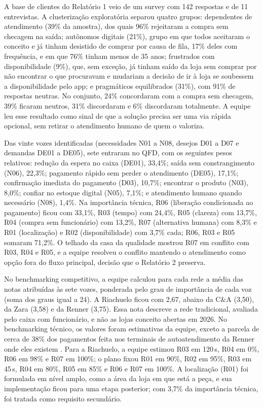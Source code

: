 A base de clientes do Relatório 1 veio de um survey com 142 respostas e de 11 entrevistas. A clusterização exploratória separou quatro grupos: dependentes de atendimento (39\% da amostra), dos quais 96\% rejeitaram a compra sem checagem na saída; autônomos digitais (21\%), grupo em que todos aceitaram o conceito e já tinham desistido de comprar por causa de fila, 17\% deles com frequência, e em que 76\% tinham menos de 35 anos; frustrados com disponibilidade (9\%), que, sem exceção, já tinham saído da loja sem comprar por não encontrar o que procuravam e mudariam a decisão de ir à loja se soubessem a disponibilidade pelo app; e pragmáticos equilibrados (31\%), com 91\% de respostas neutras. No conjunto, 24\% concordaram com a compra sem checagem, 39\% ficaram neutros, 31\% discordaram e 6\% discordaram totalmente. A equipe leu esse resultado como sinal de que a solução precisa ser uma via rápida opcional, sem retirar o atendimento humano de quem o valoriza.

Das vinte vozes identificadas (necessidades N01 a N08, desejos D01 a D07 e demandas DE01 a DE05), sete entraram no QFD, com os seguintes pesos relativos: redução da espera no caixa (DE01), 33,4\%; saída sem constrangimento (N06), 22,3\%; pagamento rápido sem perder o atendimento (DE05), 17,1\%; confirmação imediata do pagamento (D03), 10,7\%; encontrar o produto (N03), 8,0\%; confiar no estoque digital (N05), 7,1\%; e atendimento humano quando necessário (N08), 1,4\%. Na importância técnica, R06 (liberação condicionada ao pagamento) ficou com 33,1\%, R03 (tempo) com 24,4\%, R05 (clareza) com 13,7\%, R04 (compra sem funcionário) com 13,2\%, R07 (alternativa humana) com 8,3\% e R01 (localização) e R02 (disponibilidade) com 3,7\% cada; R06, R03 e R05 somaram 71,2\%. O telhado da casa da qualidade mostrou R07 em conflito com R03, R04 e R05, e a equipe resolveu o conflito mantendo o atendimento como opção fora do fluxo principal, decisão que o Relatório 2 preserva.

No benchmarking competitivo, a equipe calculou para cada rede a média das notas atribuídas às sete vozes, ponderada pelo grau de importância de cada voz (soma dos graus igual a 24). A Riachuelo ficou com 2,67, abaixo da C\&A (3,50), da Zara (3,58) e da Renner (3,75). Essa nota descreve a rede tradicional, avaliada pelo caixa com funcionário, e não as lojas conceito abertas em 2026. No benchmarking técnico, os valores foram estimativas da equipe, exceto a parcela de cerca de 38\% dos pagamentos feita nos terminais de autoatendimento da Renner onde eles existem \cite{consumidormoderno2025renner}. Para a Riachuelo, a equipe estimou R03 em 120\,s, R04 em 0\%, R06 em 98\% e R07 em 100\%; o plano fixou R01 em 90\%, R02 em 95\%, R03 em 45\,s, R04 em 80\%, R05 em 85\% e R06 e R07 em 100\%. A localização (R01) foi formulada em nível amplo, como a área da loja em que está a peça, e sua implementação ficou para uma etapa posterior; com 3,7\% da importância técnica, foi tratada como requisito secundário.

